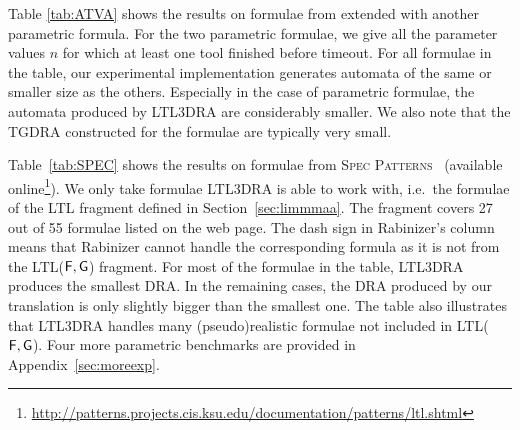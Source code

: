 \documentclass{llncs}
\begin{document}
Table \ref{tab:ATVA} shows the results on formulae from \cite{GKE12}
extended with another parametric formula. For the two parametric formulae,
we give all the parameter values $n$ for which at least one tool finished
before timeout. For all formulae in the table, our experimental
implementation generates automata of the same or smaller size as the others.
Especially in the case of parametric formulae, the automata produced by
LTL3DRA are considerably smaller. We also note that the TGDRA constructed
for the formulae are typically very small.


Table~\ref{tab:SPEC} shows the results on formulae from \textsc{Spec
  Patterns}~\cite{DAC99} (available
online\footnote{\url{http://patterns.projects.cis.ksu.edu/documentation/patterns/ltl.shtml}}).
We only take formulae LTL3DRA is able to work with, i.e.~the formulae of the
LTL fragment defined in Section~\ref{sec:limmmaa}.  The fragment covers 27
out of 55 formulae listed on the web page.  The dash sign in Rabinizer's
column means that Rabinizer cannot handle the corresponding formula as it is
not from the LTL($\mathsf{F},\mathsf{G}$) fragment.  For most of the formulae in the table,
LTL3DRA produces the smallest DRA. In the remaining cases, the DRA produced
by our translation is only slightly bigger than the smallest one.  The table
also illustrates that LTL3DRA handles many (pseudo)realistic formulae not
included in LTL($\mathsf{F},\mathsf{G}$).  
Four more parametric benchmarks are provided in Appendix~\ref{sec:moreexp}.
\end{document}
